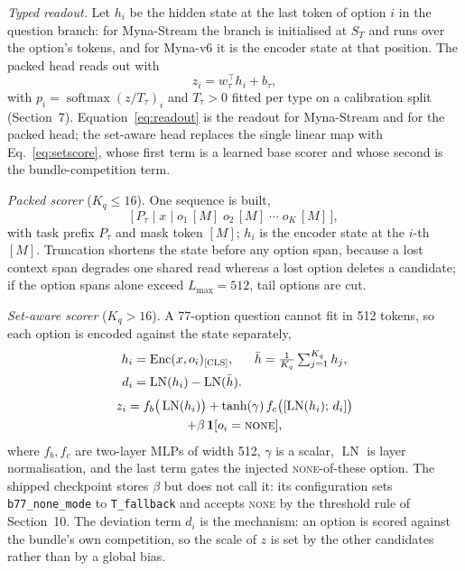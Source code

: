 \documentclass[11pt]{article}
\begin{document}
\emph{Typed readout.} Let $h_i$ be the hidden state at the last token of option $i$ in the question
branch: for Myna-Stream{} the branch is initialised at $S_T$ and runs over the option's tokens, and for
Myna-v6{} it is the encoder state at that position. The packed head reads out with
\begin{equation}
z_i = w_\tau^{\top} h_i + b_\tau, \end{equation}
with $p_i=\operatorname{softmax}(z/T_\tau)_i$ and $T_\tau>0$ fitted per type on a calibration split
(Section~7). Equation~\eqref{eq:readout} is the readout for Myna-Stream{} and for
the packed head; the set-aware head replaces the single linear map with Eq.~\eqref{eq:setscore},
whose first term is a learned base scorer and whose second is the bundle-competition term.

\emph{Packed scorer} ($K_q\le16$). One sequence is built,
\begin{equation}
\big[\,P_\tau\;|\;x\;|\;o_1\,[M]\;o_2\,[M]\;\cdots\;o_K\,[M]\,\big], \end{equation}
with task prefix $P_\tau$ and mask token $[M]$; $h_i$ is the encoder state at the $i$-th $[M]$.
Truncation shortens the state before any option span, because a lost context span degrades one
shared read whereas a lost option deletes a candidate; if the option spans alone exceed
$L_{\max}=512$, tail options are cut.

\emph{Set-aware scorer} ($K_q>16$). A 77-option question cannot fit in 512 tokens, so each option
is encoded against the state separately,
\begin{align}
h_i &= \operatorname{Enc}(x,o_i)_{\textsc{[CLS]}}, &
\bar h &= \tfrac{1}{K_q}\textstyle\sum_{j=1}^{K_q} h_j, \\
d_i &= \operatorname{LN}(h_i)-\operatorname{LN}(\bar h). & &
\end{align}
\begin{multline}
z_i = f_b\big(\operatorname{LN}(h_i)\big)
 + \tanh(\gamma)\, f_c\big([\operatorname{LN}(h_i);\,d_i]\big) \\
 + \beta\,\mathbf{1}[o_i=\textsc{none}], \end{multline}
where $f_b,f_c$ are two-layer MLPs of width 512, $\gamma$ is a scalar, $\operatorname{LN}$ is layer
normalisation, and the last term gates the injected \textsc{none}-of-these option. The shipped
checkpoint stores $\beta$ but does not call it: its configuration sets
\texttt{b77\_none\_mode} to \texttt{T\_fallback} and accepts \textsc{none} by the threshold rule of
Section~10. The deviation
term $d_i$ is the mechanism: an option is scored against the bundle's own competition, so the scale
of $z$ is set by the other candidates rather than by a global bias.
\end{document}
